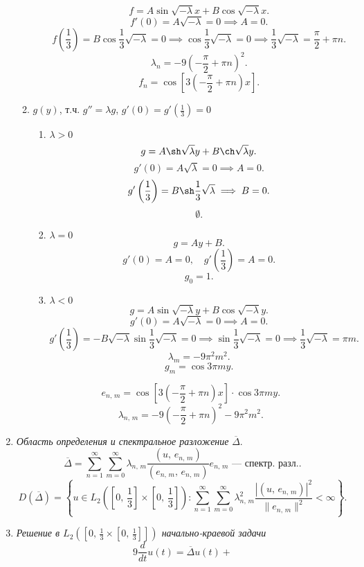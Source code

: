 \documentclass[a4paper]{article}
\begin{document}
\begin{sol}
\begin{enumerate}
\begin{enumerate}
\begin{enumerate}
	\[
	f = A \sin \sqrt{-\lambda} x+B \cos \sqrt{-\lambda} x
	.\] 
	\[
		f'(0)=A \sqrt{-\lambda} =0 \implies A=0
	.\] 
	\[
		f\left(\frac{1}{3}\right)=B \cos \frac{1}{3} \sqrt{-\lambda} =0\implies \cos \frac{1}{3} \sqrt{-\lambda} =0
		\implies \frac{1}{3}\sqrt{-\lambda} =\frac{\pi}{2}+\pi n
	.\] 
	\[
		\lambda_n=-9\left( -\frac{\pi}{2}+\pi n \right) ^2
	.\] 
	\[
		f_n= \cos \left[3\left(-\frac{\pi}{2}+\pi n  \right) x\right]
	.\] 
\end{enumerate}
\item $g(y)$, т.ч. $g''=\lambda g$, $\displaystyle g'(0)=g'\left( \frac{1}{3} \right) =0$
\begin{enumerate}
\item $\lambda>0$ 
	\[
	g= A \sh \sqrt{\lambda} y +B \ch \sqrt{\lambda} y
	.\] 
	\[
		g'(0)=A\sqrt{\lambda} =0 \implies A=0
	.\] 
	\[
		g'\left( \frac{1}{3} \right) =B \sh \frac{1}{3}
		\sqrt{\lambda} \implies B=0
	.\] 
	\[
	\emptyset
	.\] 
\item $\lambda=0$ 
	\[
	g=Ay+B
	.\] 
	\[
		g'(0)=A=0,\quad g'\left(\frac{1}{3}\right)=A=0
	.\] 
	\[
	g_0=1
	.\] 
\item $\lambda<0$ 
	\[
	g= A \sin \sqrt{-\lambda}  y+B \cos \sqrt{-\lambda} y
	.\] 
	\[
		g'(0)=A\sqrt{-\lambda} =0\implies A=0
	.\] 
	\[
		g'\left( \frac{1}{3} \right) =
		-B\sqrt{-\lambda} \sin \frac{1}{3}\sqrt{-\lambda} =0\implies \sin \frac{1}{3} \sqrt{-\lambda} =0\implies
		\frac{1}{3}\sqrt{-\lambda} =\pi m
	.\] 
	\[
	\lambda_m=-9\pi^2m^2
	.\] 
	\[
	g_m=\cos 3\pi m y
	.\] 
\end{enumerate}
\[
	e_{n,\,m}= \cos \left[ 3 \left( -\frac{\pi}{2}+
	\pi n\right) x \right]\cdot \cos 3\pi m y
.\] 
\[
	\lambda_{n,\,m}=-9\left( -\frac{\pi}{2}+\pi n \right) ^2-
	9\pi^2 m^2
.\] 
\end{enumerate}
\item \emph{Область определения и спектральное разложение} $\overline{\Delta}$.
	\[
		\overline{\Delta}= \sum_{n=1}^{\infty} \sum_{m=0}^{\infty} \lambda_{n,\,m} \frac{(u,\,e_{n,\,m})}{(e_{n,\,m},\,
		e_{n,\,m})}e_{n,\,m} \text{ --- спектр. разл.}
	.\] 
	\[
		D\left( \overline{\Delta} \right) =
		\left\{ u \in  L_2 \left( \left[ 0,\,\frac{1}{3} \right] \times \left[ 0,\,\frac{1}{3} \right]  \right) \colon 
		\sum_{n=1}^{\infty} \sum_{m=0}^{\infty} \lambda_{n,\,m}^2 \frac{|(u,\,e_{n,\,m})|^2}{\| e_{n,\,m}\|^2}<\infty\right\} 
	.\] 
\item \emph{Решение в $\displaystyle L_2\left( \left[ 0,\,\frac{1}{3}\times \left[ 0,\,\frac{1}{3} \right]  \right]  \right) $ начально-краевой задачи}
	\[
		9 \frac{d}{dt}u(t)= \overline{\Delta} u(t)+
\]
\end{enumerate}
\end{sol}
\end{document}
